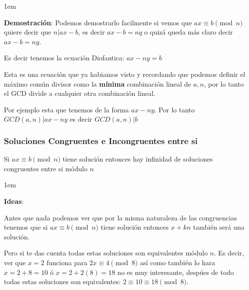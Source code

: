 \documentclass[12pt, fleqn]{report}                             %
\newenvironment{SmallIndentation}[1][0.75em]                    %
    {\begin{adjustwidth}{#1}{}\begin{footnotesize}}                 %
    {\end{footnotesize}\end{adjustwidth}}                           %
\begin{document}
                \begin{SmallIndentation}[1em]
                    \textbf{Demostración}:
                    Podemos demostrarlo facilmente si vemos que $ax \equiv b \pmod{n}$
                    quiere decir que $n|ax -b$, es decir $ax-b=nq$ o quizá queda más
                    claro decir $ax - b = ny$.

                    Es decir tenemos la ecuación Diofantica: $ax - ny = b$ 
 
                    Esta es una ecuación que ya habiamos visto y recordando que podemos definir
                    el máximo común divisor como la \textbf{mínima} combinación lineal de
                    $a, n$, por lo tanto el GCD divide a cualquier otra combinación lineal.

                    Por ejemplo esta que tenemos de la forma $ax - ny$.
                    Por lo tanto $GCD(a, n)| ax - ny$ es decir $GCD(a, n)|b$
                \end{SmallIndentation}



            \subsubsection{Soluciones Congruentes e Incongruentes entre si}

                Si $ax \equiv b \pmod{n}$ tiene solución entonces hay infinidad
                de soluciones congruentes entre si módulo $n$ 

                \begin{SmallIndentation}[1em]
                    \textbf{Ideas}:
                    
                    Antes que nada podemos ver que por la misma naturaleza de las congruencias
                    tenemos que si $ax \equiv b \pmod{n}$ tiene solución entonces
                    $x + kn$ también será una solución.

                \end{SmallIndentation}
                    
                Pero si te das cuenta todas estas soluciones son equivalentes módulo $n$.
                Es decir, ver que $x=2$ funciona para $2x \equiv 4 \pmod{8}$ así como
                también lo hara $x=2+8=10$ ó $x=2+2(8)=18$ no es muy interesante, despúes
                de todo todas estas soluciones son equivalentes:
                $2 \equiv 10 \equiv 18 \pmod{8}$.
                
\end{document}
